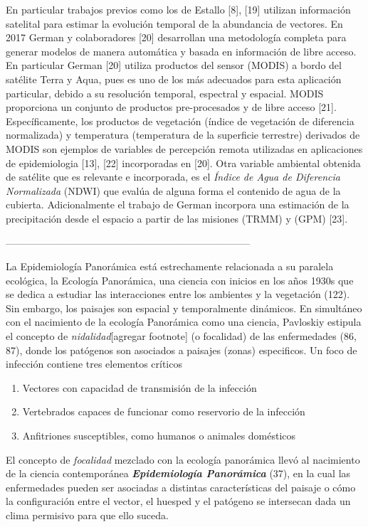 En particular trabajos previos como los de Estallo [8], [19] utilizan información
satelital para estimar la evolución temporal de la abundancia de vectores.
En 2017 German y colaboradores [20] desarrollan una metodología completa
para generar modelos de manera automática y basada en información de libre
acceso. En particular German [20] utiliza productos del sensor (MODIS) a bordo
del satélite Terra y Aqua, pues es uno de los más adecuados para esta
aplicación particular, debido a su resolución temporal, espectral y espacial.
MODIS proporciona un conjunto de productos pre-procesados y de libre acceso [21].
Específicamente, los productos de vegetación (índice de vegetación de diferencia
normalizada) y temperatura (temperatura de la superficie terrestre) derivados
de MODIS son ejemplos de variables de percepción remota utilizadas
en aplicaciones de epidemiologia [13], [22] incorporadas en [20]. Otra variable
ambiental obtenida de satélite que es relevante e incorporada, es el
\textit{Índice de Agua de Diferencia Normalizada} (NDWI) que evalúa de alguna
forma el contenido de agua de la cubierta. Adicionalmente el trabajo de German
incorpora una estimación de la precipitación desde el espacio a partir de las
misiones (TRMM) y (GPM) [23].



--------------------------------------------------------------------------


La Epidemiología Panorámica está estrechamente relacionada a su paralela
ecológica, la Ecología Panorámica, una ciencia con inicios en los años
1930s que se dedica a estudiar las interacciones entre los ambientes y la
vegetación (122).
Sin embargo, los paisajes son espacial y temporalmente dinámicos.
En simultáneo con el nacimiento de la ecología Panorámica como una ciencia,
Pavloskiy estipula el concepto de \textit{nidalidad}[agregar footnote] (o focalidad) de las
enfermedades (86, 87), donde los patógenos son asociados a paisajes (zonas)
especificos. Un foco de infección contiene tres elementos críticos
\begin{enumerate}
  \item Vectores con capacidad de transmisión de la infección
  \item Vertebrados capaces de funcionar como reservorio de la infección
  \item Anfitriones susceptibles, como humanos o animales domésticos
\end{enumerate}

El concepto de \textit{focalidad} mezclado con la ecología panorámica
llevó al nacimiento de la ciencia contemporánea
\textbf{\textit{Epidemiología Panorámica}} (37), en la cual las enfermedades
pueden ser asociadas a distintas características del paisaje o cómo
la configuración entre el vector, el huesped y el patógeno se intersecan
dada un clima permisivo para que ello suceda.

